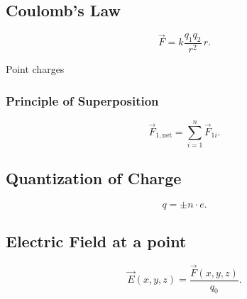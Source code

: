 
\subsection{Coulomb's Law} \label{sec:coulomblaw}
\begin{equation*}
  \Vec{F} = k \frac{q_1 q_2}{r^2}\,\hat{r}
.\end{equation*}

\begin{assumptions}
  \item Point charges
\end{assumptions}

\begin{symbols}
\end{symbols}

\subsubsection{Principle of Superposition}
\begin{equation*}
  \Vec{F}_{1, \mathrm{net}} = \sum_{i = 1}^{n} \Vec{F}_{1i}
.\end{equation*}

\begin{symbols}
\end{symbols}

\subsection{Quantization of Charge}
\begin{equation*}
  q = \pm n \cdot e
.\end{equation*}

\begin{symbols}
\end{symbols}

\subsection{Electric Field at a point}
\begin{equation*}
  \Vec{E}(x,y,z) = \frac{\Vec{F}(x,y,z)}{q_0}
.\end{equation*}

\begin{symbols}
\end{symbols}

